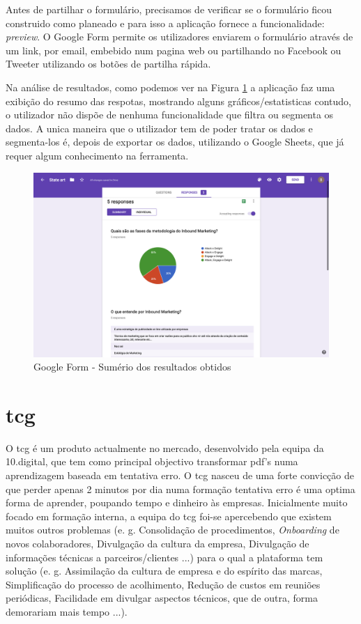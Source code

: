 Antes de partilhar o formulário, precisamos de verificar se o formulário ficou construido como planeado e para isso a aplicação fornece a funcionalidade: \textit{preview}. O Google Form permite os utilizadores enviarem o formulário através de um link, por email, embebido num pagina web ou partilhando no Facebook ou Tweeter utilizando os botões de partilha rápida.

Na análise de resultados, como podemos ver na Figura \ref{fig:gf-form-results} a aplicação faz uma exibição do resumo das respotas, mostrando alguns gráficos/estatisticas contudo, o utilizador não dispõe de nenhuma funcionalidade que filtra ou segmenta os dados. A unica maneira que o utilizador tem de poder tratar os dados e segmenta-los é, depois de exportar os dados, utilizando o Google Sheets, que já requer algum conhecimento na ferramenta. 


\begin{figure}[ht!]
	\begin{center}
		\includegraphics[width=1\textwidth]{img/gf/gf-form-results}
		\caption{Google Form - Sumério dos resultados obtidos}
		\label{fig:gf-form-results}
	\end{center}
\end{figure}

\section{\acrfull{tcg}}

O \acrlong{tcg} é um produto actualmente no mercado, desenvolvido pela equipa da 10.digital, que tem como principal objectivo transformar pdf's numa aprendizagem baseada em tentativa erro. O \acrshort{tcg} nasceu de uma forte convicção de que perder apenas 2 minutos por dia numa formação tentativa erro é uma optima forma de aprender, poupando tempo e dinheiro às empresas. Inicialmente muito focado em formação interna, a equipa do \acrshort{tcg} foi-se apercebendo que existem muitos outros problemas (e. g. Consolidação de procedimentos, \textit{Onboarding} de novos colaboradores, Divulgação da cultura da empresa, Divulgação de informações técnicas a parceiros/clientes ...) para o qual a plataforma tem solução (e. g. Assimilação da cultura de empresa e do espírito das marcas, Simplificação do processo de acolhimento, Redução de custos em reuniões periódicas, Facilidade em divulgar aspectos técnicos, que de outra, forma demorariam mais tempo ...).\cite{tcginfo}

